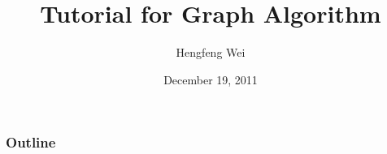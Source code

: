 \documentclass[compress]{beamer}
\title{{Tutorial for Graph Algorithm}}
\author{Hengfeng Wei}
\institute[Universities of]
{
  hengxin0912@gmail.com
}
\date{December 19, 2011}
\begin{document}
\begin{frame}
  \titlepage
\end{frame}

\begin{frame}
  \frametitle{Outline}
  \tableofcontents
\end{frame}





% 






\end{document}

